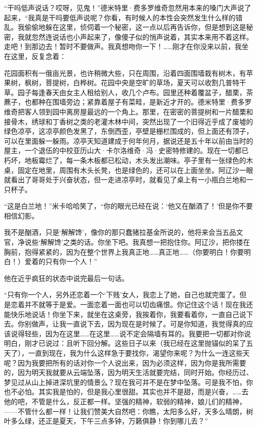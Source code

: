 \par “干吗低声说话？哎呀，见鬼！”德米特里·费多罗维奇忽然用本来的嗓门大声说了起来，“我真是干吗要低声说呢？你看，有时候人的本性会突然发生什么样的错乱。我偷偷地躲在这里，侦伺着一个秘密，这一点以后再告诉你，但是想到这是秘密，我就忽然连说话也小声起来了，像傻子似的悄声说着，其实本来用不着这样。走吧！到那边去！暂时不要做声。我真想吻你一下！……刚才在你没来以前，我坐在这里，反复念着：
\par 花园面积有一俄亩光景，也许稍微大些，只在周围，沿着四面围墙栽有树木，有苹果树，枫树，菩提树，白桦树。花园中央是空旷的草场，夏天可以收割几普特干草。园子每逢春天由女主人租给别人，收几个卢布。园里还种着覆盆子，醋栗，茶藨子，也都种在围墙旁边；紧靠着屋子有菜畦，是新近才开的。德米特里·费多罗维奇把客人领到园中离房屋最远的一个角上。那里，在密密的菩提树和一片醋栗和接骨木，绣球和丁香树之类的老灌木林中间，突然出现了一个旧得近乎成了废墟的绿色凉亭，这凉亭颜色发黑了，东倒西歪，亭壁是栅栏围成的，但上面还有顶子，可以在里面躲一躲雨。凉亭天知道建成于何年何月，据说还是五十年以前由当时的屋主，一个退伍的中校亚历山大·卡尔洛维奇·冯·史密特修建的。现在一切都已朽坏，地板霉烂了，每一条木板都已松动，木头发出潮味。亭子里有一张绿色的木桌，固定在地里，周围有木头长凳，也是绿色的，还可以在上面坐坐。阿辽沙一眼就看出了哥哥处于兴奋状态，但一走进凉亭时，就看见了桌上有一小瓶白兰地和一只杯子。
\par “这是白兰地！”米卡哈哈笑了，“你的眼光已经在说：‘他又在酗酒了！’但是你不要相信幻影。
\par 我不是酗酒，只是‘解解馋’，像你的那只蠢猪拉基金所说的，他将来会当五品文官，净说些‘解解馋’之类的话。你坐下吧。我真想一把抱住你。阿辽沙，把你搂在胸前，抱得紧紧的，因为在整个世界上我真正地……真正地……（你要明白！你要明白！）爱着的只有你一个人！”
\par 他在近乎疯狂的状态中说完最后一句话。
\par “只有你一个人，另外还恋着一个‘下贱’女人，我恋上了她，自己也就完蛋了。但是恋着并不就等于是爱。一面恋着一面也可以切齿痛恨。你记住这个话！现在我还能快乐地说话！你坐下来，就坐在这桌旁，我挨着你，我要看着你，一直自己说下去。你别做声，让我一直说下去，因为现在是时候了。可是你知道，我觉得真的应该说得轻些，因为在这里……在这里……说不定会隔墙有耳的。我要把一切都对你说明白，刚才已说过：且听下回分解。这些日子以来（我已经在这里抛锚似的呆了五天了），一直到现在，我为什么这样急于要找你，渴望你来呢？为什么一连这些天呢？因为我要把所有的话对你一个人说出来，因为必须这样，因为你是我所需要的，因为明天我就要从云端坠落，因为明天生活就要完结，同时开始。你经历过、梦见过从山上掉进深坑里的情景么？现在我可并不是在梦中坠落。可是我不怕，你也不必怕。其实我是怕的，但是我心里很甜。其实也并不是甜，而是兴奋，……去他的吧，不管是什么，反正都一样。坚强的精神，软弱的精神，娘儿们的精神，——不管什么都一样！让我们赞美大自然吧：你瞧，太阳多么好，天多么晴朗，树叶多么绿，还正是夏天，下午三点多钟，万籁俱静！你到哪儿去？”

